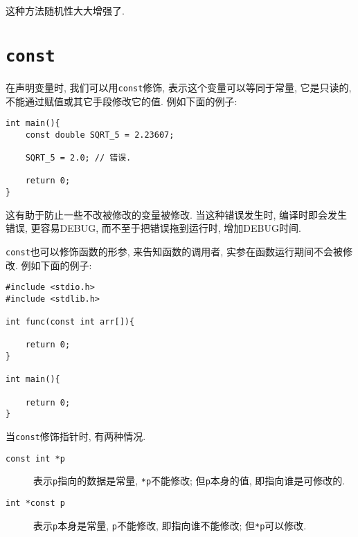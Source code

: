         这种方法随机性大大增强了.

    \section{\texttt{const}} 
        在声明变量时, 我们可以用\texttt{const}修饰, 表示这个变量可以等同于常量, 它是只读的, 不能通过赋值或其它手段修改它的值. 例如下面的例子:
\begin{lstlisting}
int main(){
    const double SQRT_5 = 2.23607;

    SQRT_5 = 2.0; // 错误.

    return 0;
}
\end{lstlisting}

        这有助于防止一些不改被修改的变量被修改. 当这种错误发生时, 编译时即会发生错误, 更容易DEBUG, 而不至于把错误拖到运行时, 增加DEBUG时间.

        \texttt{const}也可以修饰函数的形参, 来告知函数的调用者, 实参在函数运行期间不会被修改. 例如下面的例子:
\begin{lstlisting}
#include <stdio.h>
#include <stdlib.h>

int func(const int arr[]){

    return 0;
}

int main(){

    return 0;
}
\end{lstlisting}

        当\texttt{const}修饰指针时, 有两种情况.

        \begin{description}
            \item[\texttt{const int *p}] 表示\texttt{p}指向的数据是常量, \texttt{*p}不能修改; 但\texttt{p}本身的值, 即指向谁是可修改的. 
            \item[\texttt{int *const p}] 表示\texttt{p}本身是常量, \texttt{p}不能修改, 即指向谁不能修改; 但\texttt{*p}可以修改. 
        \end{description}